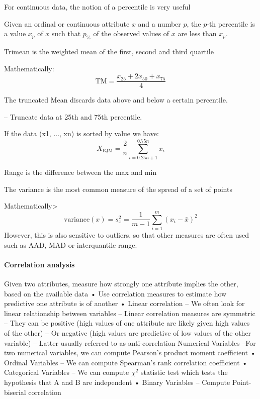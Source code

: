 For continuous data, the notion of a percentile is very useful
\begin{definition}
    Given an ordinal or continuous attribute $x$ and a number $p$, the $p$-th percentile is a value $x_p$ of $x$ such that $p_\%$ of the observed values of $x$ are less than $x_p$. 
\end{definition}

\begin{definition}
    Trimean is the weighted mean of the first, second and third quartile
\end{definition}
\noindent Mathematically: 
\[\text{TM}=\dfrac{x_{25}+2x_{50}+x_{75}}{4}\]
\begin{definition}
    The truncated Mean discards data above and below a certain percentile. 
\end{definition}
\begin{definition}
    – Truncate data at 25th and 75th percentile. 
\end{definition}
\noindent If the data (x1, ..., xn) is sorted by value we have:
\[X_{\text{IQM}}=\dfrac{2}{n}\sum_{i=0.25n+1}^{0.75n}x_i\]
\begin{definition}
    Range is the difference between the max and min
\end{definition}
\begin{definition}
    The variance is the most common measure of the spread of a set of points 
\end{definition}
\noindent Mathematically> 
\[\text{variance}(x)=s_x^2=\dfrac{1}{m-1}\sum_{i=1}^{m}(x_i-\bar{x})^2\]
\noindent However, this is also sensitive to outliers, so that other measures are often used such as AAD, MAD or interquantile range. 

\paragraph*{Correlation analysis} Given two attributes, measure how strongly
one attribute implies the other, based on
the available data
• Use correlation measures to estimate how
predictive one attribute is of another
• Linear correlation
– We often look for linear relationship between variables
– Linear correlation measures are symmetric
– They can be positive (high values of one attribute are likely given high values of the other)
– Or negative (high values are predictive of low values of the other variable)
– Latter usually referred to as anti-correlation
Numerical Variables
–For two numerical variables, we can compute Pearson’s product moment coefficient
• Ordinal Variables
– We can compute Spearman’s rank correlation coefficient
• Categorical Variables
– We can compute $\chi^2$ statistic test which tests the hypothesis that A and B are independent
• Binary Variables
– Compute Point-biserial correlation

